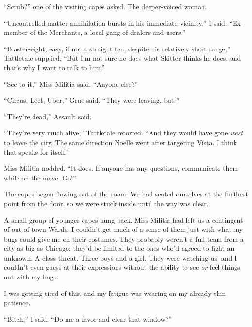 ``Scrub?'' one of the visiting capes asked.  The deeper-voiced woman.



``Uncontrolled matter-annihilation bursts in his immediate vicinity,'' I said.  ``Ex-member of the Merchants, a local gang of dealers and users.''



``Blaster-eight, easy, if not a straight ten, despite his relatively short range,'' Tattletale supplied, ``But I'm not sure he does what Skitter thinks he does, and that's why I want to talk to him.''



``See to it,'' Miss Militia said.  ``Anyone else?''



``Circus, Leet, Uber,'' Grue said.  ``They were leaving, but-''



``They're dead,'' Assault said.



``They're very much alive,'' Tattletale retorted.  ``And they would have gone \emph{west} to leave the city.  The same direction Noelle went after targeting Vista.  I think that speaks for itself.''



Miss Militia nodded.  ``It does.  If anyone has any questions, communicate them while on the move.  Go!''



The capes began flowing out of the room.  We had seated ourselves at the furthest point from the door, so we were stuck inside until the way was clear.



A small group of younger capes hung back.  Miss Militia had left us a contingent of out-of-town Wards.  I couldn't get much of a sense of them just with what my bugs could give me on their costumes.  They probably weren't a full team from a city as big as Chicago; they'd be limited to the ones who'd agreed to fight an unknown, A-class threat.  Three boys and a girl.  They were watching us, and I couldn't even guess at their expressions without the ability to see \emph{or }feel things out with my bugs.



I was getting tired of this, and my fatigue was wearing on my already thin patience.



``Bitch,'' I said.  ``Do me a favor and clear that window?''



